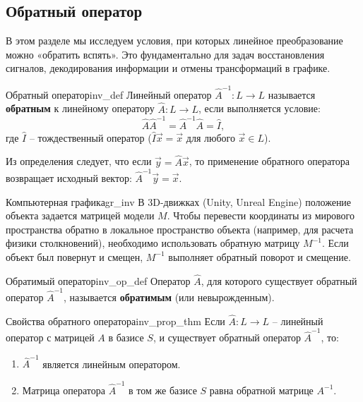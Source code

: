 \documentclass[12pt,a4paper]{article}
\begin{document}
\subsection{Обратный оператор}

В этом разделе мы исследуем условия, при которых линейное
преобразование можно «обратить вспять». Это фундаментально для задач
восстановления сигналов, декодирования информации и отмены
трансформаций в графике.

\begin{definition}{Обратный оператор}{inv_def}
  Линейный оператор $\hat{A}^{-1}: L \to L$ называется
  \textbf{обратным} к линейному оператору $\hat{A}: L \to L$, если
  выполняется условие:
  \[
    \hat{A}\hat{A}^{-1} = \hat{A}^{-1}\hat{A} = \hat{I},
  \]
  где $\hat{I}$ -- тождественный оператор ($\hat{I}\vec{x} = \vec{x}$
  для любого $\vec{x} \in L$).
\end{definition}

Из определения следует, что если $\vec{y} = \hat{A}\vec{x}$, то
применение обратного оператора возвращает исходный вектор:
$\hat{A}^{-1}\vec{y} = \vec{x}$.

\begin{remarkIT}{Компьютерная графика}{gr_inv}
  В 3D-движках (Unity, Unreal Engine) положение объекта задается
  матрицей модели $M$. Чтобы перевести координаты из мирового
  пространства обратно в локальное пространство объекта (например,
  для расчета физики столкновений), необходимо использовать обратную
  матрицу $M^{-1}$. Если объект был повернут и смещен, $M^{-1}$
  выполняет обратный поворот и смещение.
\end{remarkIT}

\begin{definition}{Обратимый оператор}{inv_op_def}
  Оператор $\hat{A}$, для которого существует обратный оператор
  $\hat{A}^{-1}$, называется \textbf{обратимым} (или невырожденным).
\end{definition}

\begin{theorem}{Свойства обратного оператора}{inv_prop_thm}
  Если $\hat{A}: L \to L$ -- линейный оператор с матрицей $A$ в
  базисе $S$, и существует обратный оператор $\hat{A}^{-1}$, то:
  \begin{enumerate}
    \item $\hat{A}^{-1}$ является линейным оператором.
    \item Матрица оператора $\hat{A}^{-1}$ в том же базисе $S$ равна
      обратной матрице $A^{-1}$.
  \end{enumerate}
\end{theorem}
\end{document}

